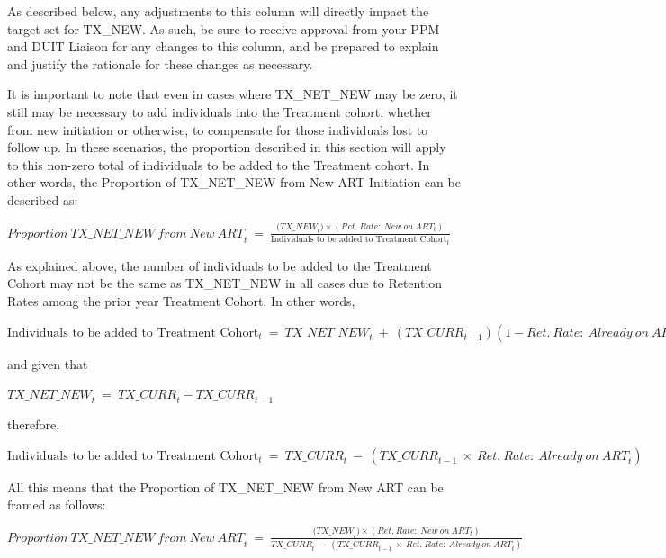 \documentclass[
  openany]{book}
\begin{document}
As described below, any adjustments to this column will directly impact
the target set for TX\_NEW. As such, be sure to receive approval from
your PPM and DUIT Liaison for any changes to this column, and be
prepared to explain and justify the rationale for these changes as
necessary.

It is important to note that even in cases where TX\_NET\_NEW may be zero,
it still may be necessary to add individuals into the Treatment cohort,
whether from new initiation or otherwise, to compensate for those
individuals lost to follow up. In these scenarios, the proportion
described in this section will apply to this non-zero total of
individuals to be added to the Treatment cohort. In other words, the
Proportion of TX\_NET\_NEW from New ART Initiation can be described as:

\begin{center} ${Proportion\ TX\_ NET\_ NEW\ from\ New\ ART}_{t}\  = \ \frac{{(TX\_ NEW}_{t}) \times ({Ret.\ Rate:\ New\ on\ ART}_{t})}{\text{Individuals\ to\ be\ added\ to\ Treatment\ Cohort}_{t}}$ \end{center}

As explained above, the number of individuals to be added to the
Treatment Cohort may not be the same as TX\_NET\_NEW in all cases due to
Retention Rates among the prior year Treatment Cohort. In other words,

\begin{center} $\text{Individuals\ to\ be\ added\ to\ Treatment\ Cohort}_{t}\  = \ {TX\_ NET\_ NEW}_{t}\  + \ ({TX\_ CURR}_{t - 1})(1 - {Ret.\ Rate:\ Already\ on\ ART}_{t})$ \end{center}

and given that

\begin{center} ${TX\_ NET\_ NEW}_{t}\  = \ {TX\_ CURR}_{t} - {TX\_ CURR}_{t - 1}$ \end{center}

therefore,

\begin{center} $\text{Individuals\ to\ be\ added\ to\ Treatment\ Cohort}_{t}\  = \ {TX\_ CURR}_{t}\  - \ ({TX\_ CURR}_{t - 1}\  \times \ {Ret.\ Rate:\ Already\ on\ ART}_{t})$ \end{center}

All this means that the Proportion of TX\_NET\_NEW from New ART can be
framed as follows:

\begin{center} ${Proportion\ TX\_ NET\_ NEW\ from\ New\ ART}_{t}\  = \ \frac{{(TX\_ NEW}_{t}) \times ({Ret.\ Rate:\ New\ on\ ART}_{t})}{{TX\_ CURR}_{t}\  - \ ({TX\_ CURR}_{t - 1}\  \times \ {Ret.\ Rate:\ Already\ on\ ART}_{t})}$ \end{center}
\end{document}

